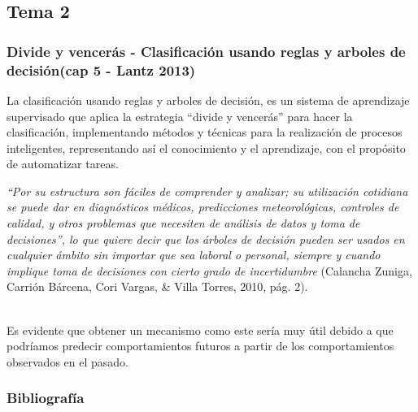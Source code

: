 \documentclass[10pt]{beamer}
\begin{document}
\subsection{Tema 2}
\begin{frame}
\frametitle{Divide y vencerás - Clasificación usando reglas y arboles de decisión(cap 5 - Lantz 2013)}
La clasificación usando reglas y arboles de decisión, es un sistema de aprendizaje supervisado que aplica la estrategia ``divide y vencerás'' para hacer la clasificación, implementando métodos y técnicas para la realización de procesos inteligentes, representando así el conocimiento y el aprendizaje, con el propósito de automatizar tareas.

\textit{``Por su estructura son fáciles de comprender y analizar; su utilización cotidiana se puede dar en diagnósticos médicos, predicciones meteorológicas, controles de calidad, y otros problemas que necesiten de análisis de datos y toma de decisiones'', lo que quiere decir que los árboles de decisión pueden ser usados en cualquier ámbito sin importar que sea laboral o personal, siempre y cuando implique toma de decisiones con cierto grado de incertidumbre} (Calancha Zuniga, Carrión Bárcena, Cori Vargas, \& Villa Torres, 2010, pág. 2).

~\\Es evidente que obtener un mecanismo como este sería muy útil debido a que podríamos predecir comportamientos futuros a partir de los comportamientos observados en el pasado.
\end{frame}

\begin{frame}
  \frametitle{Bibliografía}
  
\nocite{A1, L, EyH}
  
  
  
\end{frame}
\end{document}
